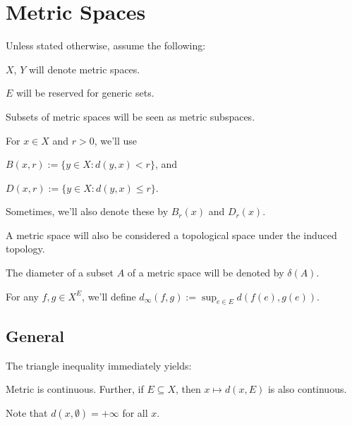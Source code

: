 %

\chapter{Metric Spaces}

\begin{conv}
	Unless stated otherwise, assume the following:
	\begin{assmplist}
		\item $X$, $Y$ will denote metric spaces.
		
		\item $E$ will be reserved for generic sets.
		
		\item Subsets of metric spaces will be seen as metric subspaces.
		
		\item For $x\in X$ and $r > 0$, we'll use
		\begin{assmplist}
			\item $B(x, r) := \{y\in X : d(y, x) < r\}$, and
			\item $D(x, r) := \{y\in X : d(y, x)\le r\}$.
		\end{assmplist}
		Sometimes, we'll also denote these by $B_r(x)$ and $D_r(x)$.
		
		\item A metric space will also be considered a topological space under the induced topology.
		
		\item The diameter of a subset $A$ of a metric space will be denoted by $\delta(A)$.
		
		\item For any $f, g\in X^E$, we'll define $d_\infty(f, g) := \sup_{e\in E}d(f(e), g(e))$.
	\end{assmplist}
\end{conv}

\section{General}
	
	The triangle inequality immediately yields:
	
	\begin{lem}
		Metric is continuous. Further, if $E\subseteq X$, then $x\mapsto d(x, E)$ is also continuous.
	\end{lem}
	
	\begin{rmk}
		Note that $d(x, \emptyset) = +\infty$ for all $x$.
	\end{rmk}
	
